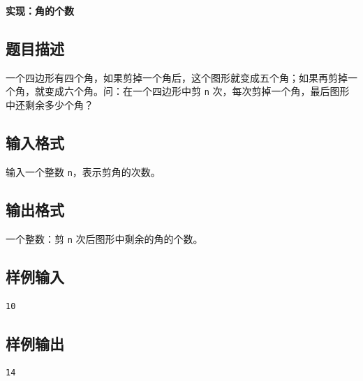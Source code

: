 \documentclass{article}
\newcommand{\problemname}[1]{\begin{center}\Large\bfseries #1\end{center}}
\begin{document}
\problemname{实现：角的个数}

\subsection*{题目描述}
一个四边形有四个角，如果剪掉一个角后，这个图形就变成五个角；如果再剪掉一个角，就变成六个角。问：在一个四边形中剪 \texttt{n} 次，每次剪掉一个角，最后图形中还剩余多少个角？

\subsection*{输入格式}
输入一个整数 \texttt{n}，表示剪角的次数。

\subsection*{输出格式}
一个整数：剪 \texttt{n} 次后图形中剩余的角的个数。

\subsection*{样例输入}
\begin{verbatim}
10
\end{verbatim}

\subsection*{样例输出}
\begin{verbatim}
14
\end{verbatim}
\end{document}
